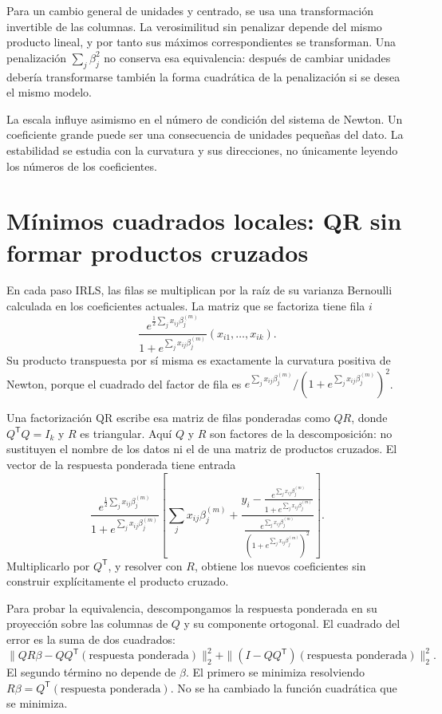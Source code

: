 \documentclass[11pt,a4paper]{article}
\newcommand{\T}{^{\mathsf T}}
\begin{document}
Para un cambio general de unidades y centrado,
se usa una transformación invertible de las columnas.
La verosimilitud sin penalizar depende del mismo producto lineal,
y por tanto sus máximos correspondientes se transforman.
Una penalización \(\sum_j\beta_j^2\) no conserva esa equivalencia:
después de cambiar unidades debería transformarse también
la forma cuadrática de la penalización si se desea el mismo modelo.

La escala influye asimismo en el número de condición del sistema
de Newton. Un coeficiente grande puede ser una consecuencia
de unidades pequeñas del dato. La estabilidad se estudia
con la curvatura y sus direcciones, no únicamente leyendo
los números de los coeficientes.

\clearpage
\section{Mínimos cuadrados locales: QR sin formar productos cruzados}\label{logit75}
En cada paso IRLS, las filas se multiplican por la raíz
de su varianza Bernoulli calculada en los coeficientes actuales.
La matriz que se factoriza tiene fila \(i\)
\[
\frac{e^{\frac12\sum_jx_{ij}\beta_j^{(m)}}}
{1+e^{\sum_jx_{ij}\beta_j^{(m)}}}
(x_{i1},\ldots,x_{ik}).
\]
Su producto transpuesta por sí misma es exactamente
la curvatura positiva de Newton, porque el cuadrado
del factor de fila es \(e^{\sum_jx_{ij}\beta_j^{(m)}}
/(1+e^{\sum_jx_{ij}\beta_j^{(m)}})^2\).

Una factorización QR escribe esa matriz de filas ponderadas
como \(QR\), donde \(Q\T Q=I_k\) y \(R\) es triangular.
Aquí \(Q\) y \(R\) son factores de la descomposición:
no sustituyen el nombre de los datos ni el de una
matriz de productos cruzados.
El vector de la respuesta ponderada tiene entrada
\[
\frac{e^{\frac12\sum_jx_{ij}\beta_j^{(m)}}}
{1+e^{\sum_jx_{ij}\beta_j^{(m)}}}
\left[
\sum_jx_{ij}\beta_j^{(m)}
+\frac{y_i-\frac{e^{\sum_jx_{ij}\beta_j^{(m)}}}
{1+e^{\sum_jx_{ij}\beta_j^{(m)}}}}
{\frac{e^{\sum_jx_{ij}\beta_j^{(m)}}}
{(1+e^{\sum_jx_{ij}\beta_j^{(m)}})^2}}
\right].
\]
Multiplicarlo por \(Q\T\), y resolver con \(R\), obtiene
los nuevos coeficientes sin construir explícitamente
el producto cruzado.

Para probar la equivalencia, descompongamos la respuesta
ponderada en su proyección sobre las columnas de \(Q\)
y su componente ortogonal.
El cuadrado del error es la suma de dos cuadrados:
\[
\|QR\beta-Q Q\T(\text{respuesta ponderada})\|_2^2
+\|(I-QQ\T)(\text{respuesta ponderada})\|_2^2.
\]
El segundo término no depende de \(\beta\).
El primero se minimiza resolviendo
\(R\beta=Q\T(\text{respuesta ponderada})\).
No se ha cambiado la función cuadrática que se minimiza.
\end{document}
